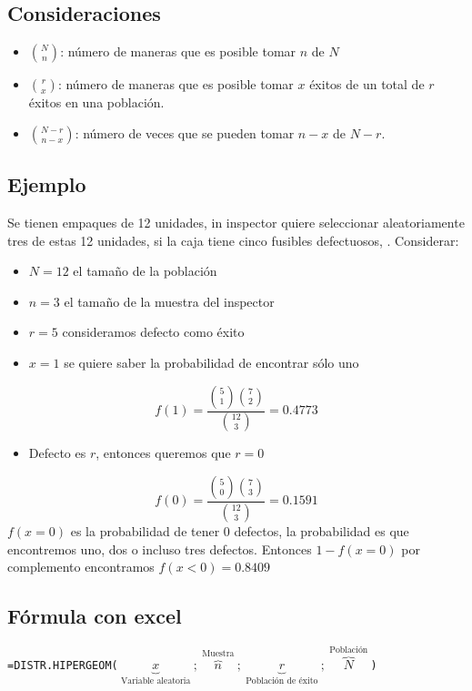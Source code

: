 \documentclass{article}
\begin{document}
\subsection{Consideraciones}
\begin{itemize}
    \item $\displaystyle \binom{N}{n}$: número de maneras que es posible tomar $n$ de $N$ 
    \item $\displaystyle \binom{r}{x}$: número de maneras que es posible tomar $x$ éxitos de un total de $r$ éxitos en una población.
    \item $\displaystyle \binom{N-r}{n-x}$: número de veces que se pueden tomar $n-x$ de $N-r$.
\end{itemize}


\subsection{Ejemplo}
Se tienen empaques de 12 unidades, in inspector quiere seleccionar aleatoriamente tres de estas 12 unidades, si la caja tiene cinco fusibles defectuosos, . Considerar:
\begin{itemize}
    \item $N=12$ el tamaño de la población 
    \item $n=3$ el tamaño de la muestra del inspector
    \item $r=5$ consideramos defecto como éxito 
    \item $x=1$ se quiere saber la probabilidad de encontrar sólo uno 
\end{itemize}
\[
  f(1) = \frac{\binom{5}{1}\binom{7}{2}}{\binom{12}{3}} = 0.4773  
\]
\begin{itemize}
    \item Defecto es $r$, entonces queremos que $r=0$ 
\end{itemize}
\[
  f(0) = \frac{\binom{5}{0}\binom{7}{3}}{\binom{12}{3}} = 0.1591
\]
$f(x=0)$ es  la probabilidad de tener 0 defectos, la probabilidad es que encontremos uno, dos o incluso tres defectos. Entonces $1-f(x=0)$ por complemento encontramos $f(x<0)=0.8409$

\subsection{Fórmula con excel}
\begin{center}
   \verb|=DISTR.HIPERGEOM(|$\underbrace{x}_{\text{ Variable aleatoria }};\overbrace{n}^{\text{ Muestra }};\underbrace{r}_{\text{ Población de éxito }};\overbrace{N}^{\text{ Población }}$\verb|)|
\end{center}
\end{document}
